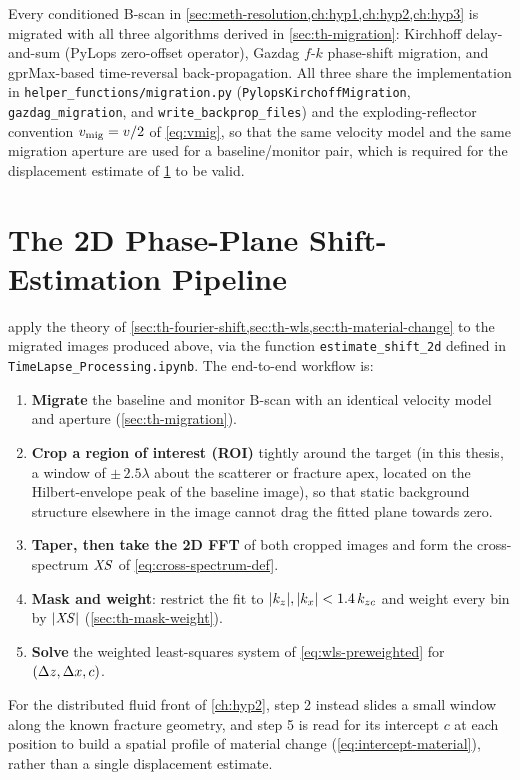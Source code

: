 Every conditioned B-scan in \cref{sec:meth-resolution,ch:hyp1,ch:hyp2,ch:hyp3}
is migrated with all three algorithms derived in \cref{sec:th-migration}:
Kirchhoff delay-and-sum (PyLops zero-offset operator), Gazdag $f$-$k$
phase-shift migration, and gprMax-based time-reversal back-propagation. All
three share the implementation in \texttt{helper\_functions/migration.py}
(\texttt{PylopsKirchoffMigration}, \texttt{gazdag\_migration}, and
\texttt{write\_backprop\_files}) and the exploding-reflector convention
$v_{\mathrm{mig}}=v/2$ of \cref{eq:vmig}, so that the same velocity model and the same
migration aperture are used for a baseline/monitor pair, which is required
for the displacement estimate of \cref{sec:meth-phaseplane} to be valid.

\section{The 2D Phase-Plane Shift-Estimation Pipeline}
\label{sec:meth-phaseplane}

 apply the theory of
\cref{sec:th-fourier-shift,sec:th-wls,sec:th-material-change} to the migrated
images produced above, via the function \texttt{estimate\_shift\_2d} defined
in \texttt{TimeLapse\_Processing.ipynb}. The end-to-end workflow is:
\begin{enumerate}
  \item \textbf{Migrate} the baseline and monitor B-scan with an identical
    velocity model and aperture (\cref{sec:th-migration}).
  \item \textbf{Crop a region of interest (ROI)} tightly around the target
    (in this thesis, a window of $\pm\,2.5\lambda$ about the scatterer or
    fracture apex, located on the Hilbert-envelope peak of the baseline
    image), so that static background structure elsewhere in the image
    cannot drag the fitted plane towards zero.
  \item \textbf{Taper, then take the 2D FFT} of both cropped images and form
    the cross-spectrum $\mathit{XS}$ of \cref{eq:cross-spectrum-def}.
  \item \textbf{Mask and weight}: restrict the fit to $|k_z|,|k_x|<1.4\,k_{zc}$
    and weight every bin by $|\mathit{XS}|$ (\cref{sec:th-mask-weight}).
  \item \textbf{Solve} the weighted least-squares system of
    \cref{eq:wls-preweighted} for $(\Delta z,\Delta x,c)$.
\end{enumerate}
For the distributed fluid front of \cref{ch:hyp2}, step 2 instead slides
a small window along the known fracture geometry, and step 5 is read for its
intercept $c$ at each position to build a spatial profile of material
change (\cref{eq:intercept-material}), rather than a single displacement
estimate.


